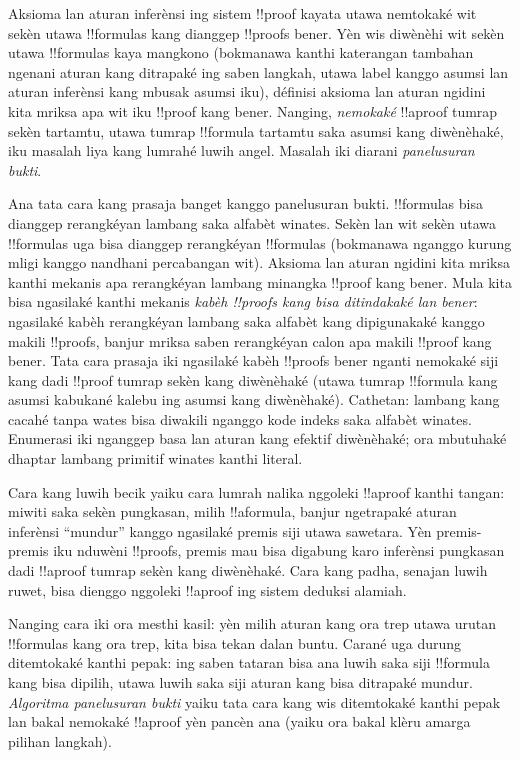 \documentclass[../../../include/open-logic-section]{subfiles}
\begin{document}


Aksioma lan aturan inferènsi ing sistem !!{proof} kayata
 utawa  nemtokaké wit sekèn utawa
!!{formula}s kang dianggep !!{proof}s bener. Yèn wis
diwènèhi wit sekèn utawa !!{formula}s kaya mangkono
(bokmanawa kanthi katerangan tambahan ngenani aturan kang
ditrapaké ing saben langkah, utawa label kanggo asumsi
lan aturan inferènsi kang mbusak asumsi iku), définisi
aksioma lan aturan ngidini kita mriksa apa wit iku
!!{proof} kang bener. Nanging, \emph{nemokaké}
!!a{proof} tumrap sekèn tartamtu, utawa tumrap
!!{formula} tartamtu saka asumsi kang diwènèhaké,
iku masalah liya kang lumrahé luwih angel. Masalah
iki diarani \emph{panelusuran bukti}.

Ana tata cara kang prasaja banget kanggo panelusuran bukti.
!!{formula}s bisa dianggep rerangkéyan lambang saka
alfabèt winates. Sekèn lan wit sekèn utawa !!{formula}s
uga bisa dianggep rerangkéyan !!{formula}s (bokmanawa
nganggo kurung mligi kanggo nandhani percabangan wit).
Aksioma lan aturan ngidini kita mriksa kanthi mekanis
apa rerangkéyan lambang minangka !!{proof} kang bener.
Mula kita bisa ngasilaké kanthi mekanis \emph{kabèh
!!{proof}s kang bisa ditindakaké lan bener}: ngasilaké kabèh
rerangkéyan lambang saka alfabèt kang dipigunakaké
kanggo makili !!{proof}s, banjur mriksa saben
rerangkéyan calon apa makili !!{proof} kang bener.
Tata cara prasaja iki ngasilaké kabèh !!{proof}s bener
nganti nemokaké siji kang dadi !!{proof} tumrap sekèn
kang diwènèhaké (utawa tumrap !!{formula} kang asumsi
kabukané kalebu ing asumsi kang diwènèhaké).
Cathetan: lambang kang cacahé tanpa wates bisa diwakili nganggo kode indeks saka alfabèt winates. Enumerasi iki nganggep basa lan aturan kang efektif diwènèhaké; ora mbutuhaké dhaptar lambang primitif winates kanthi literal.

Cara kang luwih becik yaiku cara lumrah nalika nggoleki
!!a{proof} kanthi tangan: miwiti saka sekèn pungkasan,
milih !!a{formula}, banjur ngetrapaké aturan inferènsi
``mundur'' kanggo ngasilaké premis siji utawa sawetara.
Yèn premis-premis iku nduwèni !!{proof}s, premis mau
bisa digabung karo inferènsi pungkasan dadi
!!a{proof} tumrap sekèn kang diwènèhaké. Cara kang
padha, senajan luwih ruwet, bisa dienggo nggoleki
!!a{proof} ing sistem deduksi alamiah.

Nanging cara iki ora mesthi kasil: yèn milih aturan kang
ora trep utawa urutan !!{formula}s kang ora trep, kita
bisa tekan dalan buntu. Carané uga durung ditemtokaké
kanthi pepak: ing saben tataran bisa ana luwih saka siji
!!{formula} kang bisa dipilih, utawa luwih saka siji
aturan kang bisa ditrapaké mundur. \emph{Algoritma
panelusuran bukti} yaiku tata cara kang wis ditemtokaké
kanthi pepak lan bakal nemokaké !!a{proof} yèn pancèn
ana (yaiku ora bakal klèru amarga pilihan langkah).
\end{document}
